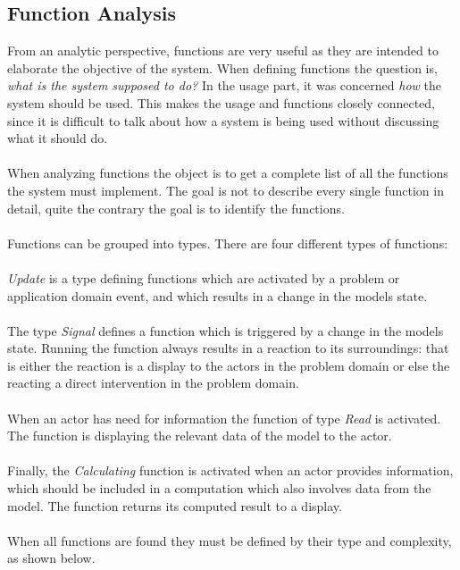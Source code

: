 \subsection{Function Analysis}
From an analytic perspective, functions are very useful as they are intended to elaborate the objective of the system. When defining functions the question is, \textit{what is the system supposed to do?} In the usage part, it was concerned \textit{how} the system should be used. This makes the usage and functions closely connected, since it is difficult to talk about how a system is being used without discussing what it should do.
\\\\ When analyzing functions the object is to get a complete list of all the functions the system must implement. The goal is not to describe every single function in detail, quite the contrary the goal is to identify the functions.
\\\\ Functions can be grouped into types. There are four different types of functions:
\\\\ \textit{Update} is a type defining functions which are activated by a problem or application domain event, and which results in a change in the models state.
\\\\ The type \textit{Signal} defines a function which is triggered by a change in the models state. Running the function always results in a reaction to its surroundings: that is either the reaction is a display to the actors in the problem domain or else the reacting a direct intervention in the problem domain.
\\\\ When an actor has need for information the function of type \textit{Read} is activated. The function is displaying the relevant data of the model to the actor.
\\\\ Finally, the \textit{Calculating} function is activated when an actor provides information, which should be included in a computation which also involves data from the model. The function returns its computed result to a display.
\\\\ When all functions are found they must be defined by their type and complexity, as shown below.\\

